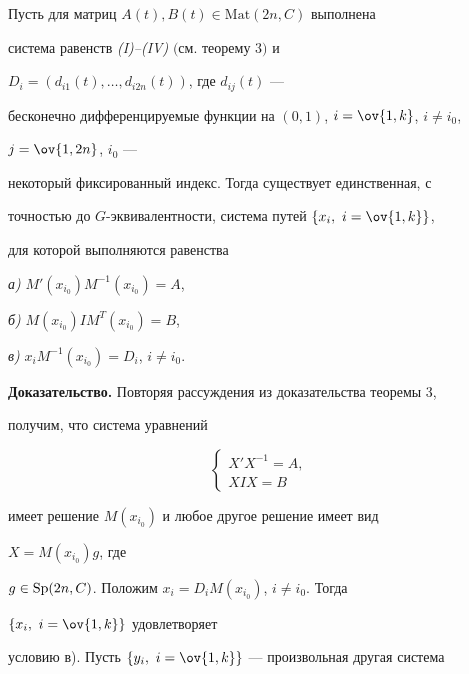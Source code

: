 \begin{thm}


Пусть для матриц $A(t),B(t)\in{\mathrm{Mat}}(2n,C)$ выполнена 


система равенств {\em (I)--(IV)} $($см. теорему $3)$ и 


$D_i=(d_{i1}(t),\dotsc,d_{i2n}(t))$, где $d_{i j}(t)$ ---


бесконечно дифференцируемые функции на $(0,1)$, $i=\ov{1,k}$, $i\ne i_0$, 


$j=\ov{1,2n}$, $i_0$ ---


некоторый фиксированный индекс. Тогда существует единственная, с 


точностью до $G$-эквивалентности, система путей $\{x_i, \ i=\ov{1,k}\}$,


для которой выполняются равенства





{\em а)} $M'(x_{i_0})M^{-1}(x_{i_0})=A$,





{\em б)} $M(x_{i_0})I M^T(x_{i_0})=B$,





{\em в)} $x_i M^{-1}(x_{i_0})=D_i$, $i\ne i_0$.


\end{thm}





{\bf Доказательство.} Повторяя рассуждения из доказательства теоремы 3, 


получим, что система уравнений


$$


\begin{cases}


X' X^{-1}=A, \\


X I X=B


\end{cases}


$$


имеет решение $M(x_{i_0})$ и любое другое решение имеет вид 


$X=M(x_{i_0})g$, где


$g\in\operatorname{Sp}(2n,C)$. Положим $x_i=D_i M(x_{i_0})$, $i\ne i_0$. Тогда 


$\{x_i, \ i=\ov{1,k}\}$ удовлетворяет


условию в). Пусть $\{y_i, \ i=\ov{1,k}\}$ --- произвольная другая система 


